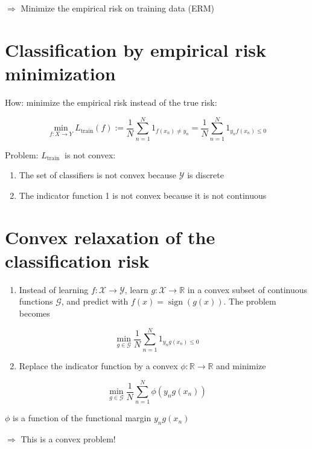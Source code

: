 \documentclass[10pt]{article}
\begin{document}
$\Rightarrow$ Minimize the empirical risk on training data (ERM)

\section*{Classification by empirical risk minimization}
How: minimize the empirical risk instead of the true risk:

$$
\min _{f: X \rightarrow Y} L_{\operatorname{train}}(f):=\frac{1}{N} \sum_{n=1}^{N} 1_{f\left(x_{n}\right) \neq y_{n}}=\frac{1}{N} \sum_{n=1}^{N} 1_{y_{n} f\left(x_{n}\right) \leq 0}
$$

Problem: $L_{\text {train }}$ is not convex:

\begin{enumerate}
  \item The set of classifiers is not convex because $\mathcal{Y}$ is discrete

  \item The indicator function 1 is not convex because it is not continuous

\end{enumerate}

\section*{Convex relaxation of the classification risk}
\begin{enumerate}
  \item Instead of learning $f: \mathscr{X} \rightarrow \mathscr{Y}$, learn $g: \mathscr{X} \rightarrow \mathbb{R}$ in a convex subset of continuous functions $\mathscr{G}$, and predict with $f(x)=\operatorname{sign}(g(x))$. The problem becomes
\end{enumerate}

$$
\min _{g \in \mathscr{G}} \frac{1}{N} \sum_{n=1}^{N} 1_{y_{n} g\left(x_{n}\right) \leq 0}
$$

\begin{enumerate}
  \setcounter{enumi}{1}
  \item Replace the indicator function by a convex $\phi: \mathbb{R} \rightarrow \mathbb{R}$ and minimize
\end{enumerate}

$$
\min _{g \in \mathscr{G}} \frac{1}{N} \sum_{n=1}^{N} \phi\left(y_{n} g\left(x_{n}\right)\right)
$$

$\phi$ is a function of the functional margin $y_{n} g\left(x_{n}\right)$

$\Rightarrow$ This is a convex problem!
\end{document}
